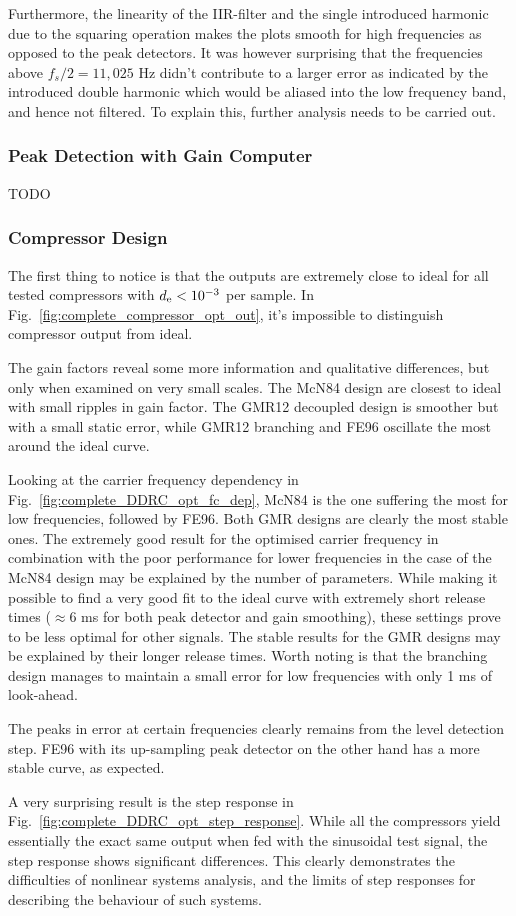 \documentclass[../main2.tex]{subfiles}
\begin{document}
Furthermore, the linearity of the IIR-filter and the single introduced harmonic due to the squaring operation makes the plots smooth for high frequencies as opposed to the peak detectors. It was however surprising that the frequencies above $f_s/2=11,025$ Hz didn't contribute to a larger error as indicated by the introduced double harmonic which would be aliased into the low frequency band, and hence not filtered. To explain this, further analysis needs to be carried out.

\subsubsection{Peak Detection with Gain Computer}
TODO

\subsubsection{Compressor Design}
The first thing to notice is that the outputs are extremely close to ideal for all tested compressors with $d_\text{e} < 10^{-3}$ per sample. In Fig.~\ref{fig:complete_compressor_opt_out}, it's impossible to distinguish compressor output from ideal.

The gain factors reveal some more information and qualitative differences, but only when examined on very small scales. The McN84 design are closest to ideal with small ripples in gain factor. The GMR12 decoupled design is smoother but with a small static error, while GMR12 branching and FE96 oscillate the most around the ideal curve.

Looking at the carrier frequency dependency in Fig.~\ref{fig:complete_DDRC_opt_fc_dep}, McN84 is the one suffering the most for low frequencies, followed by FE96. Both GMR designs are clearly the most stable ones. The extremely good result for the optimised carrier frequency in combination with the poor performance for lower frequencies in the case of the McN84 design may be explained by the number of parameters. While making it possible to find a very good fit to the ideal curve with extremely short release times ($\approx 6$ ms for both peak detector and gain smoothing), these settings prove to be less optimal for other signals. The stable results for the GMR designs may be explained by their longer release times. Worth noting is that the branching design manages to maintain a small error for low frequencies with only 1 ms of look-ahead. 

The peaks in error at certain frequencies clearly remains from the level detection step. FE96 with its up-sampling peak detector on the other hand has a more stable curve, as expected.

A very surprising result is the step response in Fig.~\ref{fig:complete_DDRC_opt_step_response}. While all the compressors yield essentially the exact same output when fed with the sinusoidal test signal, the step response shows significant differences. This clearly demonstrates the difficulties of nonlinear systems analysis, and the limits of step responses for describing the behaviour of such systems.
\end{document}
